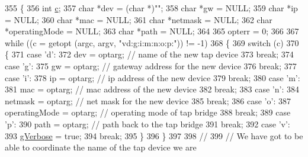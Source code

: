 \begin{DoxyCode}
355 \{
356   \textcolor{keywordtype}{int} \hyperlink{lte_2model_2fading-traces_2fading__trace__generator_8m_ae0323a9039add2978bf5b49550572c7c}{c};
357   \textcolor{keywordtype}{char} *dev = (\textcolor{keywordtype}{char} *)\textcolor{stringliteral}{""};
358   \textcolor{keywordtype}{char} *gw = NULL;
359   \textcolor{keywordtype}{char} *ip = NULL;
360   \textcolor{keywordtype}{char} *mac = NULL;
361   \textcolor{keywordtype}{char} *netmask = NULL;
362   \textcolor{keywordtype}{char} *operatingMode = NULL;
363   \textcolor{keywordtype}{char} *path = NULL;
364 
365   opterr = 0;
366 
367   \textcolor{keywordflow}{while} ((c = getopt (argc, argv, \textcolor{stringliteral}{"vd:g:i:m:n:o:p:"})) != -1)
368     \{
369       \textcolor{keywordflow}{switch} (c)
370         \{
371         \textcolor{keywordflow}{case} \textcolor{charliteral}{'d'}:
372           dev = optarg;           \textcolor{comment}{// name of the new tap device}
373           \textcolor{keywordflow}{break};
374         \textcolor{keywordflow}{case} \textcolor{charliteral}{'g'}:
375           gw = optarg;            \textcolor{comment}{// gateway address for the new device}
376           \textcolor{keywordflow}{break};
377         \textcolor{keywordflow}{case} \textcolor{charliteral}{'i'}:
378           ip = optarg;            \textcolor{comment}{// ip address of the new device}
379           \textcolor{keywordflow}{break};
380         \textcolor{keywordflow}{case} \textcolor{charliteral}{'m'}:
381           mac = optarg;           \textcolor{comment}{// mac address of the new device}
382           \textcolor{keywordflow}{break};
383         \textcolor{keywordflow}{case} \textcolor{charliteral}{'n'}:
384           netmask = optarg;       \textcolor{comment}{// net mask for the new device}
385           \textcolor{keywordflow}{break};
386         \textcolor{keywordflow}{case} \textcolor{charliteral}{'o'}:
387           operatingMode = optarg; \textcolor{comment}{// operating mode of tap bridge}
388           \textcolor{keywordflow}{break};
389         \textcolor{keywordflow}{case} \textcolor{charliteral}{'p'}:
390           path = optarg;          \textcolor{comment}{// path back to the tap bridge}
391           \textcolor{keywordflow}{break};
392         \textcolor{keywordflow}{case} \textcolor{charliteral}{'v'}:
393           \hyperlink{tap-creator_8cc_a80b7a0563409f3e21c80e0459c85845e}{gVerbose} = \textcolor{keyword}{true};
394           \textcolor{keywordflow}{break};
395         \}
396     \}
397 
398   \textcolor{comment}{//}
399   \textcolor{comment}{// We have got to be able to coordinate the name of the tap device we are}

\end{DoxyCode}
